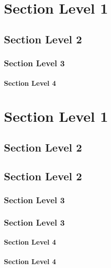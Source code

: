 \section*{Section Level 1}
\hypertarget{_section_level_1}{}

\subsection*{Section Level 2}
\hypertarget{_section_level_2}{}

\subsubsection*{Section Level 3}
\hypertarget{_section_level_3}{}

\paragraph*{Section Level 4}
\hypertarget{_section_level_4}{}

\hypertarget{_section_level_5}{}

\section*{Section Level 1}
\hypertarget{_section_level_1}{\subsection*{Section Level 2}}
\subsection*{Section Level 2}
\hypertarget{_section_level_2}{\subsubsection*{Section Level 3}}
\subsubsection*{Section Level 3}
\hypertarget{_section_level_3}{\paragraph*{Section Level 4}}
\paragraph*{Section Level 4}
\hypertarget{_section_level_4}{}
\hypertarget{_section_level_5}{}

